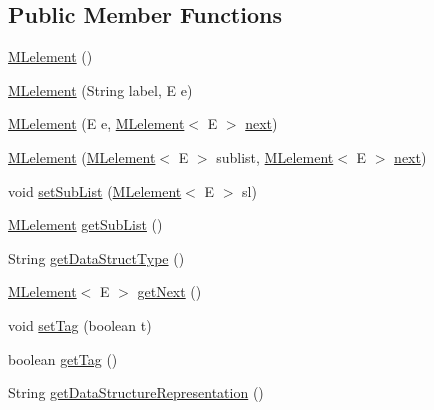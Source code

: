 \subsection*{Public Member Functions}
\begin{DoxyCompactItemize}
\item 
\mbox{\hyperlink{classbridges_1_1base_1_1_m_lelement_a721d1369c297dc3a3617a1476cb6f5f8}{M\+Lelement}} ()
\item 
\mbox{\hyperlink{classbridges_1_1base_1_1_m_lelement_ad0437d26107039d98cdba6277cff19e2}{M\+Lelement}} (String label, E e)
\item 
\mbox{\hyperlink{classbridges_1_1base_1_1_m_lelement_ad3d5fe59028cd6854eb2abceefad7f7d}{M\+Lelement}} (E e, \mbox{\hyperlink{classbridges_1_1base_1_1_m_lelement}{M\+Lelement}}$<$ E $>$ \mbox{\hyperlink{classbridges_1_1base_1_1_s_lelement_abf61c96a74ad319d561c6952ea388e0e}{next}})
\item 
\mbox{\hyperlink{classbridges_1_1base_1_1_m_lelement_aa660281523a7de140a0b17737096a332}{M\+Lelement}} (\mbox{\hyperlink{classbridges_1_1base_1_1_m_lelement}{M\+Lelement}}$<$ E $>$ sublist, \mbox{\hyperlink{classbridges_1_1base_1_1_m_lelement}{M\+Lelement}}$<$ E $>$ \mbox{\hyperlink{classbridges_1_1base_1_1_s_lelement_abf61c96a74ad319d561c6952ea388e0e}{next}})
\item 
void \mbox{\hyperlink{classbridges_1_1base_1_1_m_lelement_ab13a42b947edc61106ea56c8bd4e78fc}{set\+Sub\+List}} (\mbox{\hyperlink{classbridges_1_1base_1_1_m_lelement}{M\+Lelement}}$<$ E $>$ sl)
\item 
\mbox{\hyperlink{classbridges_1_1base_1_1_m_lelement}{M\+Lelement}} \mbox{\hyperlink{classbridges_1_1base_1_1_m_lelement_afd44cb6e17e16e13a80190747c3b7994}{get\+Sub\+List}} ()
\item 
String \mbox{\hyperlink{classbridges_1_1base_1_1_m_lelement_aa2e26697e2c70a36b8345a324d00679a}{get\+Data\+Struct\+Type}} ()
\item 
\mbox{\hyperlink{classbridges_1_1base_1_1_m_lelement}{M\+Lelement}}$<$ E $>$ \mbox{\hyperlink{classbridges_1_1base_1_1_m_lelement_a52ddc26a69eccda5f5b57b94cf87a545}{get\+Next}} ()
\item 
void \mbox{\hyperlink{classbridges_1_1base_1_1_m_lelement_a60a431ce1b27c98219924075ea764ced}{set\+Tag}} (boolean t)
\item 
boolean \mbox{\hyperlink{classbridges_1_1base_1_1_m_lelement_a95dd0972a3a47cc8ed361cf50508eaa1}{get\+Tag}} ()
\item 
String \mbox{\hyperlink{classbridges_1_1base_1_1_m_lelement_a392f05256ac08e9c19ded1387ebb7583}{get\+Data\+Structure\+Representation}} ()
\end{DoxyCompactItemize}
